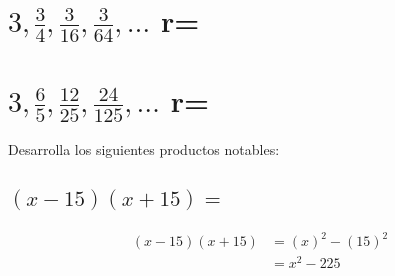 \documentclass[12pt,addpoints]{evalua}
\begin{document}
\begin{questions}
\begin{multicols}{2}
\begin{parts}
            \part {\Large $3,\frac{3}{4}, \frac{3}{16}, \frac{3}{64},\dots$ \quad r=\fillin[$\frac{1}{4}$][0cm]}

            \part {\Large $3,\frac{6}{5}, \frac{12}{25}, \frac{24}{125},\dots$ \quad r=\fillin[$\frac{2}{5}$][0cm]}

        \end{parts}

    \end{multicols}

    \newpage
    \question[10] Desarrolla los siguientes productos notables:
    \begin{multicols}{2}
        \begin{parts}
            \part {\Large $(x-15)(x+15)=$}

            \begin{solutionbox}{3cm}
                \begin{align*}
                    (x-15)(x+15) & = (x)^2-(15)^2 \\
                                 & = x^2-225
                \end{align*}
            \end{solutionbox}






\end{parts}
\end{multicols}
\end{questions}
\end{document}
